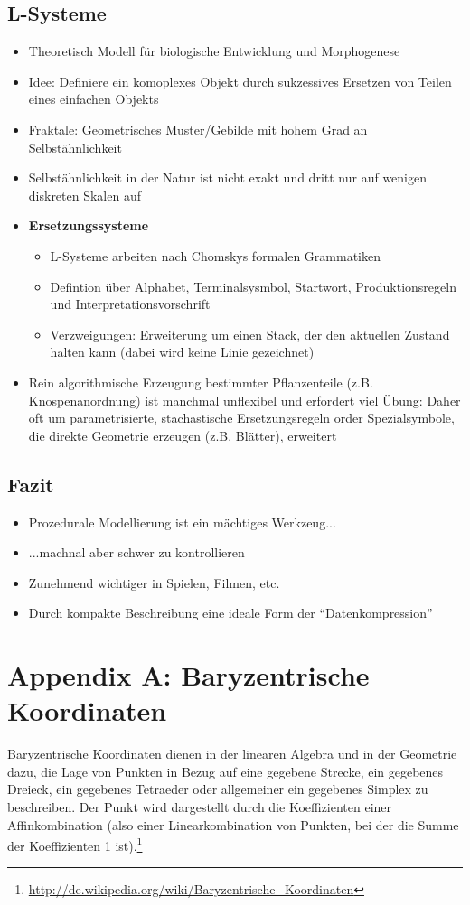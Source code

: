 \subsection{L-Systeme}
\begin{itemize}
	\item Theoretisch Modell für biologische Entwicklung und Morphogenese
	\item Idee: Definiere ein komoplexes Objekt durch sukzessives Ersetzen von Teilen eines einfachen Objekts
	\item Fraktale: Geometrisches Muster/Gebilde mit hohem Grad an Selbstähnlichkeit
	\item Selbstähnlichkeit in der Natur ist nicht exakt und dritt nur auf wenigen diskreten Skalen auf
	\item \textbf{Ersetzungssysteme}
	\begin{itemize}
		\item L-Systeme arbeiten nach Chomskys formalen Grammatiken
		\item Defintion über Alphabet, Terminalsysmbol, Startwort, Produktionsregeln und Interpretationsvorschrift
		\item Verzweigungen: Erweiterung um einen Stack, der den aktuellen Zustand halten kann (dabei wird keine Linie gezeichnet)
	\end{itemize}
	\item Rein algorithmische Erzeugung bestimmter Pflanzenteile (z.B. Knospenanordnung) ist manchmal unflexibel und erfordert viel Übung: Daher oft um parametrisierte, stachastische Ersetzungsregeln order Spezialsymbole, die direkte Geometrie erzeugen (z.B. Blätter), erweitert
\end{itemize}


\subsection{Fazit}
\begin{itemize}
	\item Prozedurale Modellierung ist ein mächtiges Werkzeug...
	\item ...machnal aber schwer zu kontrollieren
	\item Zunehmend wichtiger in Spielen, Filmen, etc.
	\item Durch kompakte Beschreibung eine ideale Form der "`Datenkompression"'
\end{itemize}



\section{Appendix A: Baryzentrische Koordinaten}
Baryzentrische Koordinaten dienen in der linearen Algebra und in der Geometrie dazu, die Lage von Punkten in Bezug auf eine gegebene Strecke, ein gegebenes Dreieck, ein gegebenes Tetraeder oder allgemeiner ein gegebenes Simplex zu beschreiben. Der Punkt wird dargestellt durch die Koeffizienten einer Affinkombination (also einer Linearkombination von Punkten, bei der die Summe der Koeffizienten 1 ist).\footnote{\url{http://de.wikipedia.org/wiki/Baryzentrische_Koordinaten}}

